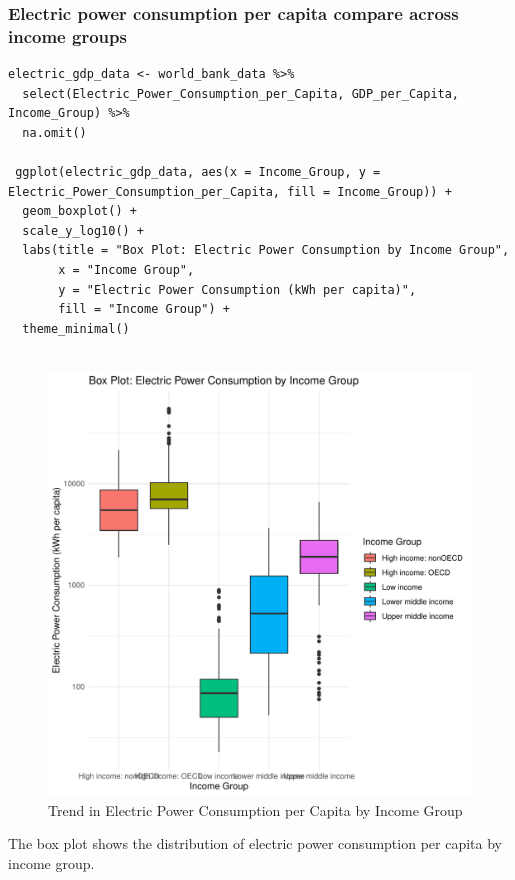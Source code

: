 \documentclass{article}\usepackage[]{graphicx}\usepackage[]{xcolor}
\makeatletter
\def\maxwidth{ %
  \ifdim\Gin@nat@width>\linewidth
    \linewidth
  \else
    \Gin@nat@width
  \fi
}
\newenvironment{knitrout}{}{} %
\makeatother
\begin{document}
\subsubsection{Electric power consumption per capita compare across income groups}
\begin{lstlisting}
electric_gdp_data <- world_bank_data %>%
  select(Electric_Power_Consumption_per_Capita, GDP_per_Capita, Income_Group) %>%
  na.omit()

 ggplot(electric_gdp_data, aes(x = Income_Group, y = Electric_Power_Consumption_per_Capita, fill = Income_Group)) +
  geom_boxplot() +
  scale_y_log10() + 
  labs(title = "Box Plot: Electric Power Consumption by Income Group",
       x = "Income Group",
       y = "Electric Power Consumption (kWh per capita)",
       fill = "Income Group") +
  theme_minimal()


\end{lstlisting}
\newpage
\begin{figure}[h!]
\centering
\begin{knitrout}
\color{fgcolor}
\includegraphics[width=\maxwidth]{figure/unnamed-chunk-12-1} 
\end{knitrout}
\caption{Trend in Electric Power Consumption per Capita by Income Group}
\label{fig}
\end{figure}
The box plot shows the distribution of electric power consumption per capita by income group. 
\end{document}
